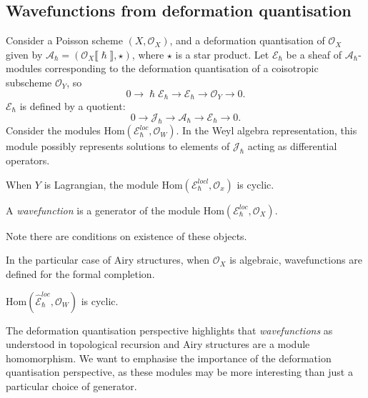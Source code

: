     \subsection{Wavefunctions from deformation quantisation}

    
    Consider a Poisson scheme \((X,\mathcal{O}_X)\), and a deformation quantisation of \( \mathcal{O}_X\) given by \( \mathcal{A}_{\hslash} = (\mathcal{O}_X\lBrack \hslash \rBrack,\star )\), where \( \star\) is a star product.
    Let \( \mathcal{E}_{\hslash}\) be a sheaf of \( \mathcal{A}_{\hslash}\)-modules corresponding to the deformation quantisation of a coisotropic subscheme \( \mathcal{O}_Y\), so
    \[ 0 \rightarrow \hslash \mathcal{E}_{\hslash} \rightarrow \mathcal{E}_{\hslash} \rightarrow \mathcal{O}_Y \rightarrow 0.\]
    \( \mathcal{E}_{\hslash}\) is defined by a quotient:
    \[ 0 \rightarrow \mathcal{J}_\hslash  \rightarrow \mathcal{A}_\hslash  \rightarrow \mathcal{E}_\hslash \rightarrow 0.\]
    Consider the modules \( \mathrm{Hom}(\mathcal{E}^{loc}_{\hslash},\mathcal{O}_W)\). In the Weyl algebra representation, this module possibly represents solutions to elements of \( \mathcal{J}_{\hslash} \) acting as differential operators.
    
    \begin{prop} When \(Y\) is Lagrangian, the module \(\mathrm{Hom}(\mathcal{E}^{locl}_{\hslash}, \mathcal{O}_x )\) is cyclic.
    \end{prop}

    \begin{defn}[Wavefunction]
    A \emph{wavefunction} is a generator of the module \( \mathrm{Hom}(\mathcal{E}^{loc}_{\hslash}, \mathcal{O}_X)\).
    \end{defn}
    Note there are conditions on existence of these objects.
    
    In the particular case of Airy structures, when \( \mathcal{O}_X \) is algebraic, wavefunctions are defined for the formal completion.
    \begin{prop}
     \(\mathrm{Hom}\left(\widehat{\mathcal{E}}^{loc}_{\hslash},\mathcal{O}_W\right)\) is cyclic.
    \end{prop}

    The deformation quantisation perspective highlights that \emph{wavefunctions} as understood in topological recursion and Airy structures are a module homomorphism. 
    We want to emphasise the importance of the deformation quantisation perspective, as these modules may be more interesting than just a particular choice of generator.
    
